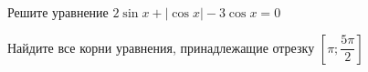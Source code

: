 \begin{ex}
	\begin{condition}
		\begin{enumcols}[label=\asbuk*)]
			\item Решите уравнение \( 2\sin x + |\cos x|-3\cos x = 0 \)
			\item Найдите все корни уравнения, принадлежащие отрезку \( \left[\pi;\dfrac{5\pi}{2}\right] \)
		\end{enumcols}
	\end{condition}
\end{ex}